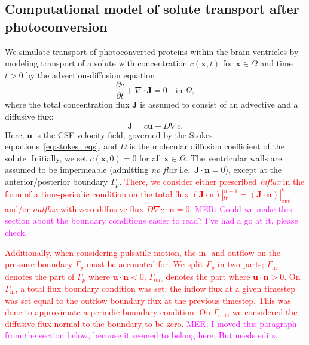 \documentclass[fleqn]{wlscirep}
\newcommand{\pdifft}[1]{\frac{\partial  #1}{\partial t}}
\newcommand{\Gp}{\Gamma_{p}}
\newcommand{\Gin}{\Gamma_{\mathrm{in}}}
\newcommand{\Gout}{\Gamma_{\mathrm{out}}}
\newcommand{\nn}{\mathbf{n}}
\newcommand{\uu}{\mathbf{u}}
\newcommand{\xx}{\bm{x}}
\newcommand{\JJ}{\mathbf{J}}
\newcommand{\mer}[1]{\textcolor{magenta}{#1}}
\newcommand{\fixme}[1]{\textcolor{red}{#1}}
\begin{document}
\subsection*{Computational model of solute transport after photoconversion}
We simulate transport of photoconverted proteins within the brain ventricles by modeling transport of a solute with concentration $c(\xx, t)$ for $\xx\in\Omega$ and time $t > 0$ by the advection-diffusion equation
\begin{equation}
    \pdifft{c} + \nabla\cdot\JJ = 0 \quad \text{in } \Omega,
    \label{eq:adv_diff_strong}
\end{equation}
where the total concentration flux $\mathbf{J}$ is assumed to consist of an advective and a diffusive flux:
\begin{equation*}
    \JJ = c\uu - D\nabla c .
\end{equation*}
Here, $\uu$ is the CSF velocity field, governed by the Stokes equations~\eqref{eq:stokes_eqs}, and $D$ is the molecular diffusion coefficient of the solute. Initially, we set $c(\xx, 0)=0$ for all $\xx\in\Omega$. The ventricular walls are assumed to be impermeable (admitting \emph{no flux} i.e.~$\JJ\cdot\nn=0$), except at the anterior/posterior boundary $\Gamma_p$. \fixme{There, we consider either prescribed \emph{influx} in the form of a time-periodic condition on the total flux $(\JJ\cdot\nn)|_{\mathrm{in}}^{n+1}=(\JJ\cdot\nn)|_{\mathrm{out}}^{n}$ and/or \emph{outflux} with zero diffusive flux $D\nabla c\cdot\nn=0$.}
\mer{MER: Could we make this section about the boundary conditions easier to read? I've had a go at it, please check.}

\fixme{Additionally, when considering pulsatile motion, the in- and outflow on the pressure boundary $\Gp$ must be accounted for. We split $\Gp$ in two parts; $\Gin$ denotes the part of $\Gp$ where $\uu\cdot\nn < 0$; $\Gout$ denotes the part where $\uu\cdot\nn > 0$. On $\Gin$, a total flux boundary condition was set: the inflow flux at a given timestep was set equal to the outflow boundary flux at the previous timestep. This was done to approximate a periodic boundary condition. On $\Gout$, we considered the diffusive flux normal to the boundary to be zero.}
\mer{MER: I moved this paragraph from the section below, because it seemed to belong here. But needs edits.} 

\end{document}
